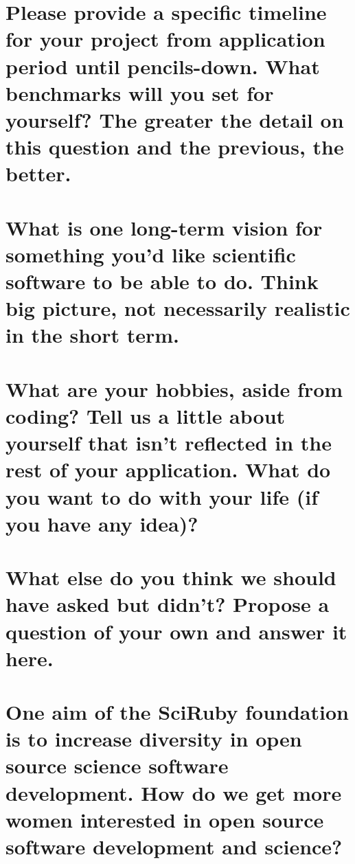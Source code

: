 \section{Please provide a specific timeline for your project from application period until pencils-down. What benchmarks will you set for yourself? The greater the detail on this question and the previous, the better.}

\section{What is one long-term vision for something you'd like scientific software to be able to do. Think big picture, not necessarily realistic in the short term.}

\section{What are your hobbies, aside from coding? Tell us a little about yourself that isn't reflected in the rest of your application. What do you want to do with your life (if you have any idea)?}

\section{What else do you think we should have asked but didn't? Propose a question of your own and answer it here.}

\section{One aim of the SciRuby foundation is to increase diversity in open source science software development. How do we get more women interested in open source software development and science?}


